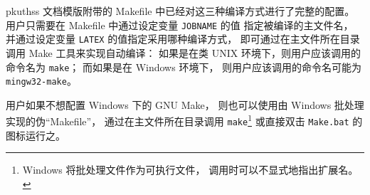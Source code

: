 	pkuthss 文档模版附带的 Makefile 中已经对这三种编译方式进行了完整的配置。
	用户只需要在 Makefile 中通过设定变量 \verb|JOBNAME| 的值%
	指定被编译的主文件名，
	并通过设定变量 \verb|LATEX| 的值指定采用哪种编译方式，
	即可通过在主文件所在目录调用 Make 工具来实现自动编译：
	如果是在类 UNIX 环境下，则用户应该调用的命令名为 \verb|make|；
	而如果是在 Windows 环境下，
	则用户应该调用的命令名可能为 \verb|mingw32-make|。

	用户如果不想配置 Windows 下的 GNU Make，
	则也可以使用由 Windows 批处理实现的伪“Makefile”，
	通过在主文件所在目录调用 \verb|make|\footnote{%
		Windows 将批处理文件作为可执行文件，
		调用时可以不显式地指出扩展名。%
	} 或直接双击 \verb|Make.bat| 的图标运行之。


